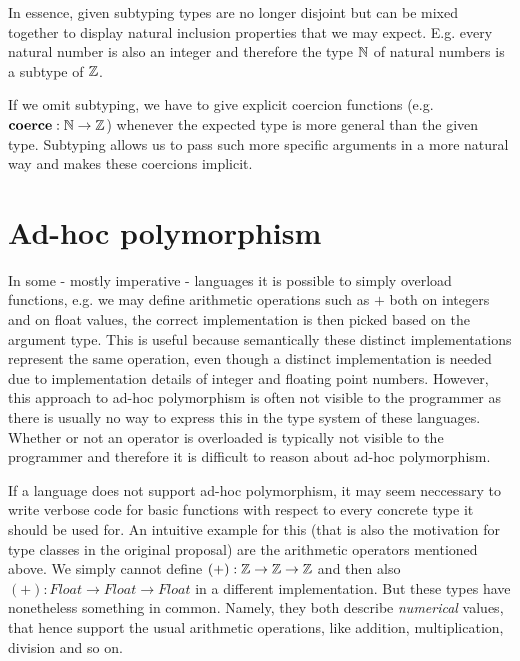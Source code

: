 In essence, given subtyping types are no longer disjoint but can be mixed together to display natural inclusion properties that we may expect.
E.g. every natural number is also an integer and therefore the type $\mathbb{N}$ of natural numbers is a subtype of $\mathbb{Z}$.

If we omit subtyping, we have to give explicit coercion functions (e.g. $\mathbf{coerce} : \mathbb{N} \to \mathbb{Z}$) whenever the expected type is more general than the given type.
Subtyping allows us to pass such more specific arguments in a more natural way and makes these coercions implicit.

\section{Ad-hoc polymorphism}
\label{sec:ad-hoc-polymorphism}

In some - mostly imperative - languages it is possible to simply overload functions, e.g. we may define arithmetic operations such as $+$ both on integers and on float values, the correct implementation is then picked based on the argument type.
This is useful because semantically these distinct implementations represent the same operation, even though a distinct implementation is needed due to implementation details of integer and floating point numbers.
However, this approach to ad-hoc polymorphism is often not visible to the programmer as there is usually no way to express this in the type system of these languages.
Whether or not an operator is overloaded is typically not visible to the programmer and therefore it is difficult to reason about ad-hoc polymorphism. %

If a language does not support ad-hoc polymorphism, it may seem neccessary to write verbose code for basic functions with respect to every concrete type it should be used for.
An intuitive example for this (that is also the motivation for type classes in the original proposal) are the arithmetic operators mentioned above.
We simply cannot define $(+) : \mathbb{Z} \to \mathbb{Z} \to \mathbb{Z}$ and then also $(+) : \mathit{Float} \to \mathit{Float} \to \mathit{Float}$ in a different implementation.
But these types have nonetheless something in common.
Namely, they both describe \emph{numerical} values, that hence support the usual arithmetic operations, like addition, multiplication, division and so on.

